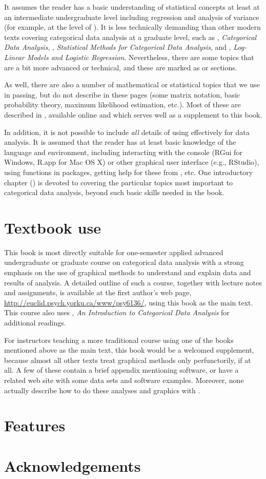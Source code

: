 It assumes the reader has a basic understanding of statistical concepts at least at an
intermediate undergraduate level including regression and analysis of variance
(for example, at the level of \citet{Neter-etal:90,MendenhallSincich:2003}).
It is less technically demanding than other modern texts covering
categorical data analysis at a graduate level, such as
 \citet{Agresti:2013}, \emph{Categorical Data Analysis},
 \citet{PowersXie:2008}, \emph{Statistical Methods for Categorical Data Analysis}, and
 \citet{Christensen:97}, \emph{Log-Linear Models and Logistic Regression}.
Nevertheless, there are some topics that are a bit more advanced or technical, and
these are marked as \hard or \veryhard sections.

As well, there are also a number of mathematical or 
statistical topics that we use in passing, but do not describe
in these pages (some matrix notation, basic probability theory, maximum likelihood estimation, etc.).
Most of these are described in \citet{Fox:2015}, available online and which serves well as
a supplement to this book.


In addition, it is not possible to include \emph{all} details of using \R effectively for
data analysis. It is assumed that the reader has at least basic knowledge of the \R language and
environment, including interacting with the \R console (RGui for Windows, R.app for Mac OS X)
or other graphical user interface (e.g., RStudio), using \R functions in packages,
getting help for these from \R, etc.  One introductory chapter () is devoted
to covering the particular topics most important to categorical data analysis,
beyond such basic skills needed in the book.

\section*{Textbook use}
This book is most directly suitable for one-semester applied 
advanced undergraduate or graduate
course on categorical data analysis with a strong emphasis
on the use of graphical methods to understand and explain data and
results of analysis.
A detailed outline of such a course, together with lecture notes
and assignments,
is available at the first author's
web page, \url{http://euclid.psych.yorku.ca/www/psy6136/}, using this
book as the main text.  This course also uses 
\citet{Agresti:2007:ICDA}, \emph{An Introduction to Categorical Data Analysis}
for additional readings.

For instructors teaching a more traditional course using one of the books
mentioned above as the main text, this book would be a welcomed supplement,
because almost all other texts treat graphical methods only perfunctorily,
if at all.
A few of these contain a brief appendix mentioning software, or have
a related web site with some data sets and software examples.
Moreover, none actually describe how to do these analyses and graphics with \R.

\section*{Features}


\section*{Acknowledgements}


